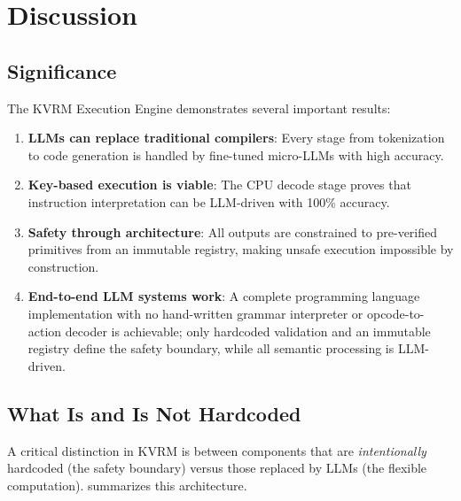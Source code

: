 \documentclass[11pt,a4paper]{article}
\begin{document}
\section{Discussion}
\label{sec:discussion}

\subsection{Significance}

The KVRM Execution Engine demonstrates several important results:

\begin{enumerate}
    \item \textbf{LLMs can replace traditional compilers}: Every stage from tokenization to code generation is handled by fine-tuned micro-LLMs with high accuracy.

    \item \textbf{Key-based execution is viable}: The CPU decode stage proves that instruction interpretation can be LLM-driven with 100\% accuracy.

    \item \textbf{Safety through architecture}: All outputs are constrained to pre-verified primitives from an immutable registry, making unsafe execution impossible by construction.

    \item \textbf{End-to-end LLM systems work}: A complete programming language implementation with no hand-written grammar interpreter or opcode-to-action decoder is achievable; only hardcoded validation and an immutable registry define the safety boundary, while all semantic processing is LLM-driven.
\end{enumerate}

\subsection{What Is and Is Not Hardcoded}
\label{subsec:hardcoded-clarification}

A critical distinction in KVRM is between components that are \textit{intentionally} hardcoded (the safety boundary) versus those replaced by LLMs (the flexible computation).  summarizes this architecture.
\end{document}
